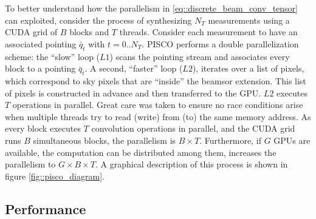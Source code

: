 \documentclass[a4paper,11pt]{article}
\begin{document}
To better understand how the parallelism in \ref{eq::discrete_beam_conv_tensor} can exploited, consider the process of synthesizing $N_T$ measurements using a CUDA grid of $B$ blocks and $T$ threads. Consider each measurement to have an associated pointing $\bar{q}_t$ with $t=0..N_T$. PISCO performs a double parallelization scheme: the ``slow'' loop ($L1$) scans the pointing stream and associates every block to a pointing $\bar{q}_t$. A second, ``faster'' loop ($L2$), iterates over a list of pixels, which correspond to sky pixels that are ``inside'' the beamsor extension. This list of pixels is constructed in advance and then transferred to the GPU. $L2$ executes $T$ operations in parallel. Great care was taken to ensure no race conditions arise when multiple threads try to read (write) from (to) the same memory address. As every block executes $T$ convolution operations in parallel, and the CUDA grid runs $B$ simultaneous blocks, the parallelism is $B \times T$. Furthermore, if $G$ GPUs are available, the computation can be distributed among them, increases the parallelism to $G \times B \times T$. A graphical description of this process is shown in figure \ref{fig::pisco_diagram}.

\subsection{Performance}
\end{document}

